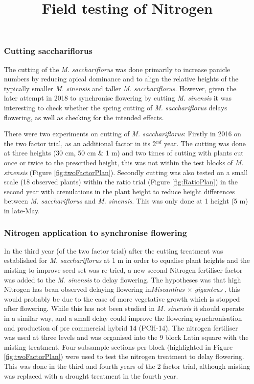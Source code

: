 \documentclass[fleqn, 15pt, lineno]{olplainarticle}
\begin{document}
\FloatBarrier
\subsubsection{Cutting sacchariflorus}
The cutting of the \textit{M. sacchariflorus} was done primarily to increase panicle numbers by reducing apical dominance and to align the relative heights of the typically smaller \textit{M. sinensis} and taller \textit{M. sacchariflorus}.
However, given the later attempt in 2018 to synchronise flowering by cutting \textit{M. sinensis} it was interesting to check whether the spring cutting of \textit{M. sacchariflorus} delays flowering, as well as checking for the intended effects.

There were two  experiments on cutting of \textit{M. sacchariflorus}: 
Firstly in 2016 on the two factor trial, as an additional factor in its 2$^{nd}$ year.
The cutting was done at three heights (30 cm, 50 cm \& 1 m) and two times of cutting with plants cut once or twice to the prescribed height, this was not within the test blocks of \textit{M. sinensis} (Figure \ref{fig:twoFactorPlan}). 
Secondly cutting was also tested on a small scale (18 observed plants) within the ratio trial (Figure \ref{fig:RatioPlan}) in the second year with crenulations in the plant height to reduce height differences between \textit{M. sacchariflorus} and \textit{M. sinensis}. 
This was only done at 1 height (5 m) in late-May.




\FloatBarrier
\subsubsection{Nitrogen application to synchronise flowering}
\title{Field testing of Nitrogen}

In the third year (of the two factor trial) after the cutting treatment was established for \textit{M. sacchariflorus} at 1 m in order to equalise plant heights and the misting to improve seed set was re-tried, a new second Nitrogen fertiliser factor was added to the \textit{M. sinensis} to delay flowering.
The hypotheses was that high Nitrogen has bean observed delaying flowering in\textit{Miscanthus $\times$ giganteus} \citep{HEATON2009}, this would probably be due to the ease of more vegetative growth which is stopped after flowering.
While this has not been studied in \textit{M. sinensis} it should operate in a similar way, and a small delay could improve the flowering synchronisation and production of  pre commercial hybrid 14 (PCH-14).
The nitrogen fertiliser was used at three levels and was organised into the 9 block Latin square with the misting treatment.
Four subsample sections per block (highlighted in Figure \ref{fig:twoFactorPlan}) were used to test the nitrogen treatment to delay flowering.
This was done in the third and fourth years of the 2 factor trial, although misting was replaced with a drought treatment in the fourth year.
\end{document}
